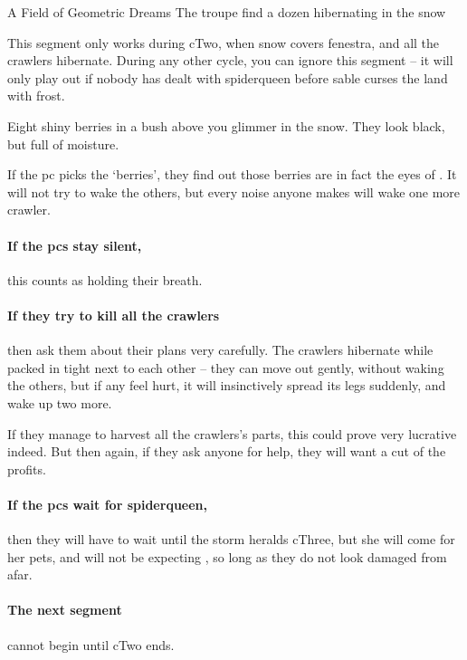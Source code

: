 {A Field of Geometric Dreams}%
{The troupe find a dozen hibernating  in the snow}%
\label{spiderDreams}

This \gls{segment} only works during \gls{cTwo}, when \gls{snow} covers \gls{fenestra}, and all the \glspl{crawler} hibernate.
During any other \gls{cycle}, you can ignore this \gls{segment} -- it will only play out if nobody has dealt with \gls{spiderqueen} before \gls{sable} curses the land with frost.

\begin{boxtext}
	Eight shiny berries in a bush above you glimmer in the snow.
	They look black, but full of moisture.
\end{boxtext}

If the \gls{pc} picks the `berries', they find out those berries are in fact the eyes of .
It will not try to wake the others, but every noise anyone makes will wake one more \gls{crawler}.

\paragraph{If the \glspl{pc} stay silent,}
this counts as holding their breath.%

\paragraph{If they try to kill all the \glspl{crawler}}
then ask them about their plans very carefully.
The \glspl{crawler} hibernate while packed in tight next to each other -- they can move out gently, without waking the others, but if any feel hurt, it will insinctively spread its legs suddenly, and wake up two more.



If they manage to harvest all the \glspl{crawler}'s parts, this could prove very lucrative indeed.
But then again, if they ask anyone for help, they will want a cut of the profits.

\paragraph{If the \glspl{pc} wait for \gls{spiderqueen},}
then they will have to wait until the \gls{storm} heralds \gls{cThree}, but she will come for her pets, and will not be expecting , so long as they do not look damaged from afar.

\paragraph{The next \gls{segment}}
cannot begin until \gls{cTwo} ends.
